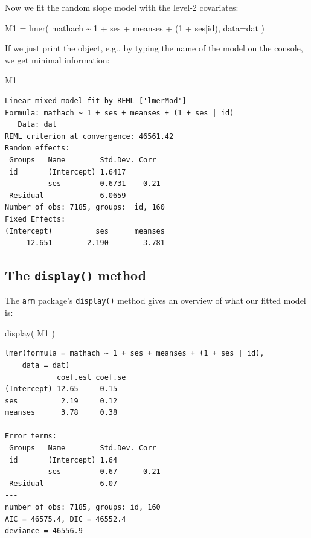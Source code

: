 \documentclass[
  letterpaper,
  DIV=11,
  numbers=noendperiod]{scrreprt}
\newenvironment{Shaded}{\begin{snugshade}}{\end{snugshade}}
\newcommand{\AttributeTok}[1]{\textcolor[rgb]{0.49,0.56,0.16}{#1}}
\newcommand{\DecValTok}[1]{\textcolor[rgb]{0.25,0.63,0.44}{#1}}
\newcommand{\FunctionTok}[1]{\textcolor[rgb]{0.02,0.16,0.49}{#1}}
\newcommand{\NormalTok}[1]{\textcolor[rgb]{0.00,0.44,0.13}{#1}}
\newcommand{\OtherTok}[1]{\textcolor[rgb]{0.00,0.44,0.13}{#1}}
\newcommand{\SpecialCharTok}[1]{\textcolor[rgb]{0.25,0.44,0.63}{#1}}
\begin{document}
Now we fit the random slope model with the level-2 covariates:

\begin{Shaded}
\begin{Highlighting}[]
\NormalTok{M1 }\OtherTok{=} \FunctionTok{lmer}\NormalTok{( mathach }\SpecialCharTok{\textasciitilde{}} \DecValTok{1} \SpecialCharTok{+}\NormalTok{ ses }\SpecialCharTok{+}\NormalTok{ meanses }\SpecialCharTok{+}\NormalTok{ (}\DecValTok{1} \SpecialCharTok{+}\NormalTok{ ses}\SpecialCharTok{|}\NormalTok{id), }\AttributeTok{data=}\NormalTok{dat )}
\end{Highlighting}
\end{Shaded}

If we just print the object, e.g., by typing the name of the model on
the console, we get minimal information:

\begin{Shaded}
\begin{Highlighting}[]
\NormalTok{M1}
\end{Highlighting}
\end{Shaded}

\begin{verbatim}
Linear mixed model fit by REML ['lmerMod']
Formula: mathach ~ 1 + ses + meanses + (1 + ses | id)
   Data: dat
REML criterion at convergence: 46561.42
Random effects:
 Groups   Name        Std.Dev. Corr 
 id       (Intercept) 1.6417        
          ses         0.6731   -0.21
 Residual             6.0659        
Number of obs: 7185, groups:  id, 160
Fixed Effects:
(Intercept)          ses      meanses  
     12.651        2.190        3.781  
\end{verbatim}

\hypertarget{the-display-method}{%
\subsection{\texorpdfstring{The \texttt{display()}
method}{The display() method}}\label{the-display-method}}

The \texttt{arm} package's \texttt{display()} method gives an overview
of what our fitted model is:

\begin{Shaded}
\begin{Highlighting}[]
\FunctionTok{display}\NormalTok{( M1 )}
\end{Highlighting}
\end{Shaded}

\begin{verbatim}
lmer(formula = mathach ~ 1 + ses + meanses + (1 + ses | id), 
    data = dat)
            coef.est coef.se
(Intercept) 12.65     0.15  
ses          2.19     0.12  
meanses      3.78     0.38  

Error terms:
 Groups   Name        Std.Dev. Corr  
 id       (Intercept) 1.64           
          ses         0.67     -0.21 
 Residual             6.07           
---
number of obs: 7185, groups: id, 160
AIC = 46575.4, DIC = 46552.4
deviance = 46556.9 
\end{verbatim}
\end{document}
